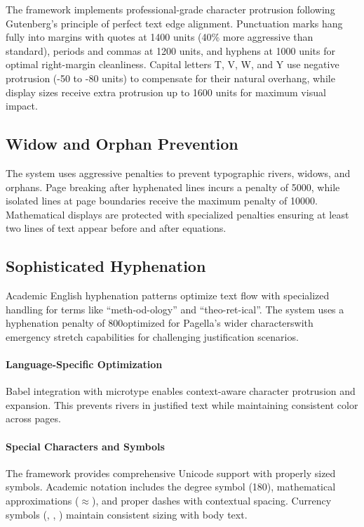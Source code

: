 \documentclass[11pt]{article}
\begin{document}
The framework implements professional-grade character protrusion following Gutenberg's principle of perfect text edge alignment. Punctuation marks hang fully into margins with quotes at 1400 units (40\% more aggressive than standard), periods and commas at 1200 units, and hyphens at 1000 units for optimal right-margin cleanliness. Capital letters T, V, W, and Y use negative protrusion (-50 to -80 units) to compensate for their natural overhang, while display sizes receive extra protrusion up to 1600 units for maximum visual impact.

\subsection{Widow and Orphan Prevention}

The system uses aggressive penalties to prevent typographic rivers, widows, and orphans. Page breaking after hyphenated lines incurs a penalty of 5000, while isolated lines at page boundaries receive the maximum penalty of 10000. Mathematical displays are protected with specialized penalties ensuring at least two lines of text appear before and after equations.

\subsection{Sophisticated Hyphenation}

Academic English hyphenation patterns optimize text flow with specialized handling for terms like \enquote{meth-od-ology} and \enquote{theo-ret-ical}. The system uses a hyphenation penalty of 800\emdash{}optimized for Pagella's wider characters\emdash{}with emergency stretch capabilities for challenging justification scenarios.

\paragraph{Language-Specific Optimization} Babel integration with microtype enables context-aware character protrusion and expansion. This prevents rivers in justified text while maintaining consistent color across pages.

\paragraph{Special Characters and Symbols} The framework provides comprehensive Unicode support with properly sized symbols. Academic notation includes the degree symbol (180\textdegree), mathematical approximations ($\approx$), and proper dashes with contextual spacing. Currency symbols (\texteuro, \textsterling, \textyen) maintain consistent sizing with body text.
\end{document}
